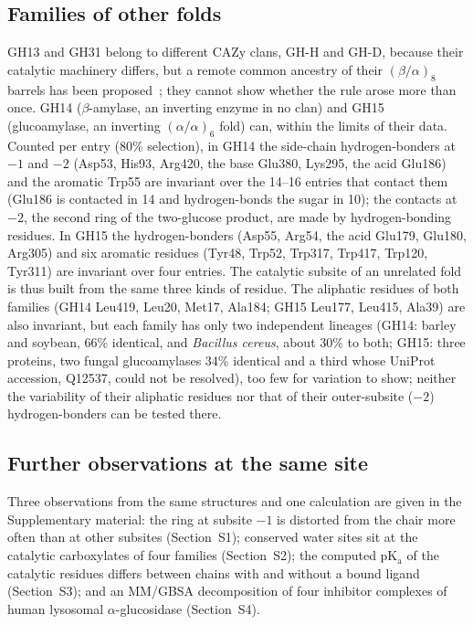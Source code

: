 \documentclass[preprint,12pt]{elsarticle}
\begin{document}
\subsection{Families of other folds}\label{sec:folds}
GH13 and GH31 belong to different CAZy clans, GH-H and
GH-D, because their catalytic machinery differs, but a remote common ancestry of their
$(\beta/\alpha)_8$ barrels has been proposed~\citep{Janecek2007,Rigden2002}; they cannot show
whether the rule arose more than once. GH14 ($\beta$-amylase, an inverting enzyme in no
clan) and GH15 (glucoamylase, an inverting $(\alpha/\alpha)_6$ fold) can, within the limits
of their data. Counted per entry (80\% selection), in GH14 the side-chain hydrogen-bonders at $-1$ and $-2$ (Asp53, His93,
Arg420, the base Glu380, Lys295, the acid Glu186) and the aromatic Trp55 are invariant over
the 14--16 entries that contact them (Glu186 is contacted in 14 and hydrogen-bonds the sugar
in 10); the contacts at $-2$, the second ring of the two-glucose product, are made by
hydrogen-bonding residues. In GH15 the
hydrogen-bonders (Asp55, Arg54, the acid Glu179, Glu180, Arg305) and six aromatic residues
(Tyr48, Trp52, Trp317, Trp417, Trp120, Tyr311) are invariant over four entries. The
catalytic subsite of an unrelated fold is thus built from the same three kinds of residue.
The aliphatic residues of both families (GH14 Leu419, Leu20, Met17, Ala184; GH15 Leu177,
Leu415, Ala39) are also invariant, but each family has only two independent lineages
(GH14: barley and soybean, 66\% identical, and \emph{Bacillus cereus}, about 30\% to both;
GH15: three proteins, two fungal glucoamylases 34\% identical and a third whose UniProt
accession, Q12537, could not be resolved), too few for variation to show; neither the variability
of their aliphatic residues nor that of their outer-subsite ($-2$) hydrogen-bonders can be
tested there.

\subsection{Further observations at the same site}
Three observations from the same
structures and one calculation are given in the Supplementary material: the ring at
subsite $-1$ is distorted from the chair more often than at other subsites (Section~S1);
conserved water sites sit at the catalytic carboxylates of four families (Section~S2);
the computed pK$_\mathrm{a}$ of the catalytic residues differs between chains with and
without a bound ligand (Section~S3); and an MM/GBSA decomposition of four inhibitor
complexes of human lysosomal $\alpha$-glucosidase (Section~S4).
\end{document}
